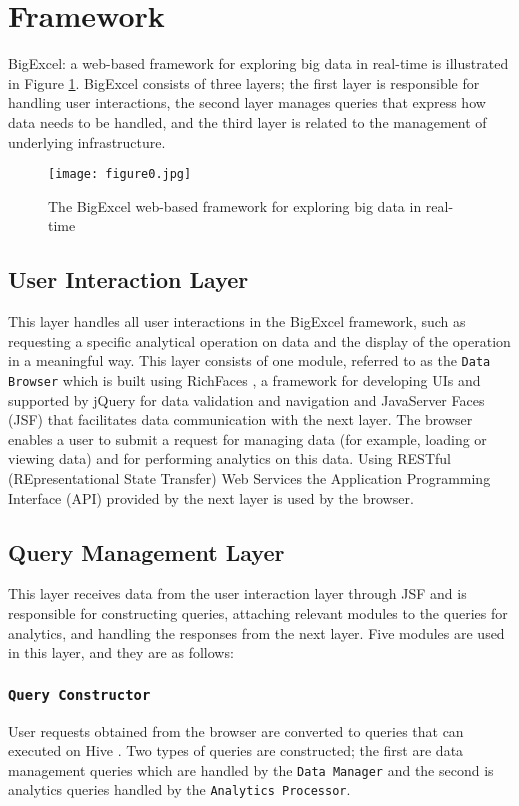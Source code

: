 \documentclass[10pt, conference, compsocconf]{IEEEtran}
\begin{document}
\section{Framework}
\label{framework}

BigExcel: a web-based framework for exploring big data in real-time is illustrated in Figure \ref{figure0}. BigExcel consists of three layers; the first layer is responsible for handling user interactions, the second layer manages queries that express how data needs to be handled, and the third layer is related to the management of underlying infrastructure.

\begin{figure} [!ht]
	\centering
	\texttt{[image: figure0.jpg]}
	\caption{The BigExcel web-based framework for exploring big data in real-time}
	\label{figure0}
\end{figure} 

\subsection{User Interaction Layer}
This layer handles all user interactions in the BigExcel framework, such as requesting a specific analytical operation on data and the display of the operation in a meaningful way. This layer consists of one module, referred to as the \texttt{Data Browser} which is built using RichFaces \cite{richfaces}, a framework for developing UIs and supported by jQuery \cite{jquery} for data validation and navigation and JavaServer Faces (JSF) \cite{jsf} that facilitates data communication with the next layer. The browser enables a user to submit a request for managing data (for example, loading or viewing data) and for performing analytics on this data. Using RESTful (REpresentational State Transfer) Web Services \cite{restful-1} the Application Programming Interface (API) provided by the next layer is used by the browser. 

\subsection{Query Management Layer}
This layer receives data from the user interaction layer through JSF and is responsible for constructing queries, attaching relevant modules to the queries for analytics, and handling the responses from the next layer. Five modules are used in this layer, and they are as follows:  

\subsubsection{\normalfont \texttt{Query Constructor}}
User requests obtained from the browser are converted to queries that can executed on Hive \cite{hive-1}. Two types of queries are constructed; the first are data management queries which are handled by the \texttt{Data Manager} and the second is analytics queries handled by the \texttt{Analytics Processor}. 
\end{document}
